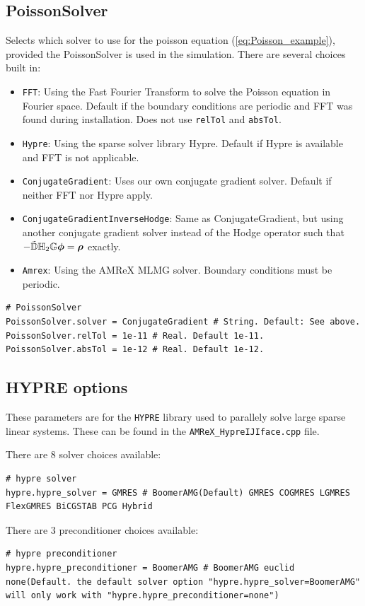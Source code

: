 \documentclass[11pt]{article}
\begin{document}
\subsection{PoissonSolver}\label{sec:PoissonSolverInput}
Selects which solver to use for the poisson equation (\ref{eq:Poisson_example}), provided the PoissonSolver is used in the simulation.
There are several choices built in:
\begin{itemize}
	\item \verb|FFT|: Using the Fast Fourier Transform to solve the Poisson equation in Fourier space. Default if the boundary conditions are periodic and FFT was found during installation. Does not use \verb|relTol| and \verb|absTol|.
	\item \verb|Hypre|: Using the sparse solver library Hypre. Default if Hypre is available and FFT is not applicable.
	\item \verb|ConjugateGradient|: Uses our own conjugate gradient solver. Default if neither FFT nor Hypre apply.
	\item \verb|ConjugateGradientInverseHodge|: Same as ConjugateGradient, but using another conjugate gradient solver instead of the Hodge operator such that $-\tilde{\mathbb{D}}{\mathbb{H}}_2\mathbb{G}{\boldsymbol {\rm \mathsf{\phi}}}={\boldsymbol {\rm \mathsf{\rho}}}$ exactly.
	\item \verb|Amrex|: Using the AMReX MLMG solver. Boundary conditions must be periodic.
\end{itemize}
\begin{lstlisting}[language=pkgconfig]
# PoissonSolver
PoissonSolver.solver = ConjugateGradient # String. Default: See above.
PoissonSolver.relTol = 1e-11 # Real. Default 1e-11.
PoissonSolver.absTol = 1e-12 # Real. Default 1e-12.
\end{lstlisting}

\subsection{HYPRE options}
These parameters are for the \verb|HYPRE| library used to parallely solve large sparse linear systems. These can be found in the \verb|AMReX_HypreIJIface.cpp| file.

There are 8 solver choices available:
\begin{lstlisting}[language=pkgconfig]
# hypre solver
hypre.hypre_solver = GMRES # BoomerAMG(Default) GMRES COGMRES LGMRES FlexGMRES BiCGSTAB PCG Hybrid
\end{lstlisting}

There are 3 preconditioner choices available: 
\begin{lstlisting}[language=pkgconfig]
# hypre preconditioner
hypre.hypre_preconditioner = BoomerAMG # BoomerAMG euclid none(Default. the default solver option "hypre.hypre_solver=BoomerAMG" will only work with "hypre.hypre_preconditioner=none")
\end{lstlisting}
\end{document}
